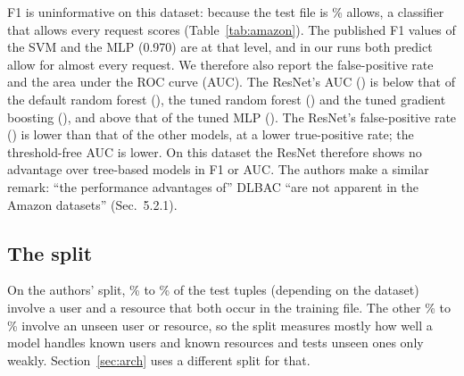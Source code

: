 \documentclass[11pt,a4paper]{article}
\begin{document}
F1 is uninformative on this dataset: because the test file is \amPosRate\% allows, a classifier that allows every request scores \amAllAllowFOne{} (Table~\ref{tab:amazon}). The published F1 values of the SVM and the MLP (0.970) are at that level, and in our runs both predict allow for almost every request. We therefore also report the false-positive rate and the area under the ROC curve (AUC). The ResNet's AUC (\amResnetAuc) is below that of the default random forest (\amRfTheirsAuc), the tuned random forest (\amRfTunedAuc) and the tuned gradient boosting (\amGbTunedAuc), and above that of the tuned MLP (\amMlpTunedAuc). The ResNet's false-positive rate (\amResnetFpr) is lower than that of the other models, at a lower true-positive rate; the threshold-free AUC is lower. On this dataset the ResNet therefore shows no advantage over tree-based models in F1 or AUC. The authors make a similar remark: ``the performance advantages of'' DLBAC ``are not apparent in the Amazon datasets'' (Sec.~5.2.1).

\begin{table}[t]
\centering\footnotesize

\caption{amazon1 on the authors' split (mean over five seeds). \emph{Published F1}: read off the figures of \cite{nobi2022}. \emph{All-allow}: a classifier that allows every request. AUC is not defined for the SVM (hard decisions) and is averaged over the seeds in which a model outputs more than two distinct values (two of five for the default MLP, which allows nearly everything). Published F1 values are read off figures (resolution about 0.015).}
\label{tab:amazon}
\end{table}

\subsection{The split}
On the authors' split, \overlapMin\% to \overlapMax\% of the test tuples (depending on the dataset) involve a user and a resource that both occur in the training file. The other \unseenMin\% to \unseenMax\% involve an unseen user or resource, so the split measures mostly how well a model handles known users and known resources and tests unseen ones only weakly. Section~\ref{sec:arch} uses a different split for that.
\end{document}
